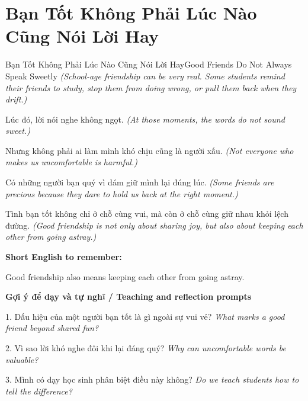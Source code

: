 \section{Bạn Tốt Không Phải Lúc Nào Cũng Nói Lời Hay}
\begin{truyen}{Bạn Tốt Không Phải Lúc Nào Cũng Nói Lời Hay}{Good Friends Do Not Always Speak Sweetly}
\textit{(School-age friendship can be very real. Some students remind their friends to study, stop them from doing wrong, or pull them back when they drift.)}

Lúc đó, lời nói nghe không ngọt.
\textit{(At those moments, the words do not sound sweet.)}

Nhưng không phải ai làm mình khó chịu cũng là người xấu.
\textit{(Not everyone who makes us uncomfortable is harmful.)}

Có những người bạn quý vì dám giữ mình lại đúng lúc.
\textit{(Some friends are precious because they dare to hold us back at the right moment.)}

\end{truyen}

\begin{baihoc}
Tình bạn tốt không chỉ ở chỗ cùng vui, mà còn ở chỗ cùng giữ nhau khỏi lệch đường.
\textit{(Good friendship is not only about sharing joy, but also about keeping each other from going astray.)}
\end{baihoc}

\begin{ghinhoanh}
\textbf{Short English to remember:}

Good friendship also means keeping each other from going astray.

\end{ghinhoanh}

\begin{tuhocnhanh}
\textbf{Gợi ý để dạy và tự nghĩ / Teaching and reflection prompts}

1. Dấu hiệu của một người bạn tốt là gì ngoài sự vui vẻ? \textit{What marks a good friend beyond shared fun?}

2. Vì sao lời khó nghe đôi khi lại đáng quý? \textit{Why can uncomfortable words be valuable?}

3. Mình có dạy học sinh phân biệt điều này không? \textit{Do we teach students how to tell the difference?}
\end{tuhocnhanh}
